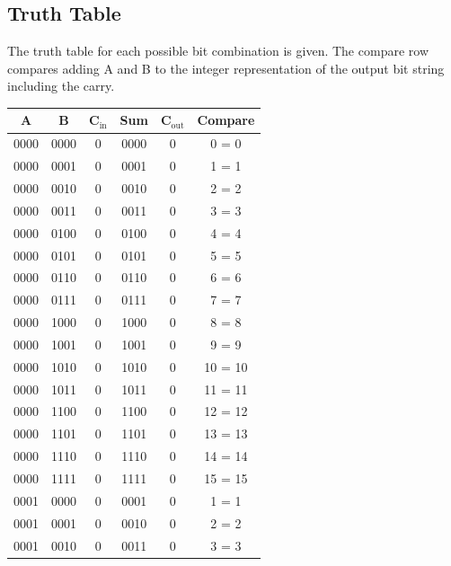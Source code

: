 \documentclass{exam}
\begin{document}
    \subsection{Truth Table}
        The truth table for each possible bit combination is given. The compare row compares adding A and B to the integer representation of the output bit string including the carry.
    \begin{center}
            \begin{longtable}{|c|c|c|c|c|c|}
                \hline
                \textbf{A} & \textbf{B} & \textbf{C$_{\text{in}}$} & \textbf{Sum}& \textbf{C$_{\text{out}}$} & \textbf{Compare}\\ \hline
                0000 & 0000 & 0 & 0000 & 0 & 0 = 0 \\ \hline
                0000 & 0001 & 0 & 0001 & 0 & 1 = 1 \\ \hline
                0000 & 0010 & 0 & 0010 & 0 & 2 = 2 \\ \hline
                0000 & 0011 & 0 & 0011 & 0 & 3 = 3 \\ \hline
                0000 & 0100 & 0 & 0100 & 0 & 4 = 4 \\ \hline
                0000 & 0101 & 0 & 0101 & 0 & 5 = 5 \\ \hline
                0000 & 0110 & 0 & 0110 & 0 & 6 = 6 \\ \hline
                0000 & 0111 & 0 & 0111 & 0 & 7 = 7 \\ \hline
                0000 & 1000 & 0 & 1000 & 0 & 8 = 8 \\ \hline
                0000 & 1001 & 0 & 1001 & 0 & 9 = 9 \\ \hline
                0000 & 1010 & 0 & 1010 & 0 & 10 = 10 \\ \hline
                0000 & 1011 & 0 & 1011 & 0 & 11 = 11 \\ \hline
                0000 & 1100 & 0 & 1100 & 0 & 12 = 12 \\ \hline
                0000 & 1101 & 0 & 1101 & 0 & 13 = 13 \\ \hline
                0000 & 1110 & 0 & 1110 & 0 & 14 = 14 \\ \hline
                0000 & 1111 & 0 & 1111 & 0 & 15 = 15 \\ \hline
                0001 & 0000 & 0 & 0001 & 0 & 1 = 1 \\ \hline
                0001 & 0001 & 0 & 0010 & 0 & 2 = 2 \\ \hline
                0001 & 0010 & 0 & 0011 & 0 & 3 = 3 \\ \hline

\end{longtable}
\end{center}
\end{document}
